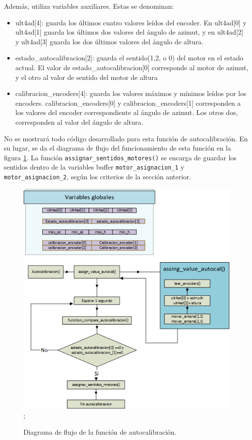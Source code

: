 Además, utiliza variables auxiliares. Estas se denominan: 
\begin{itemize}
	\item ult4ad[4]: guarda los últimos cuatro valores leídos del encoder. En ult4ad[0] y ult4ad[1] guarda los últimos dos valores del ángulo de azimut, y en ult4ad[2] y ult4ad[3] guarda los dos últimos valores del ángulo de altura. 
	\item estado\_autocalibracion[2]: guarda el sentido(1,2, o 0) del motor en el estado actual. El valor de estado\_autocalibracion[0] corresponde al motor de azimut, y el otro al valor de sentido del motor de altura 
	\item calibracion\_encoders[4]: guarda los valores máximos y mínimos leídos por los encoders. calibracion\_encoders[0] y calibracion\_encoders[1] corresponden a los valores del encoder correspondiente al ángulo de azimut. Los otros dos, corresponden al valor del ángulo de altura.   
\end{itemize}

No se mostrará todo código desarrollado para esta función de autocalibración. En su lugar, se da el diagrama de flujo del funcionamiento de esta función en la figura \ref{fig:flujo_autocalibracion}. La función \texttt{assignar_sentidos_motores()} se encarga de guardar los sentidos dentro de la variables buffer \texttt{motor_asignacion_1} y \texttt{motor_asignacion_2}, según los criterios de la sección anterior. 
\begin{figure}[ht]
	\centering
	\includegraphics{flujo_autocal} ; 
	\caption{Diagrama de flujo de la función de autocalibración.}
	\label{fig:flujo_autocalibracion}
\end{figure}

